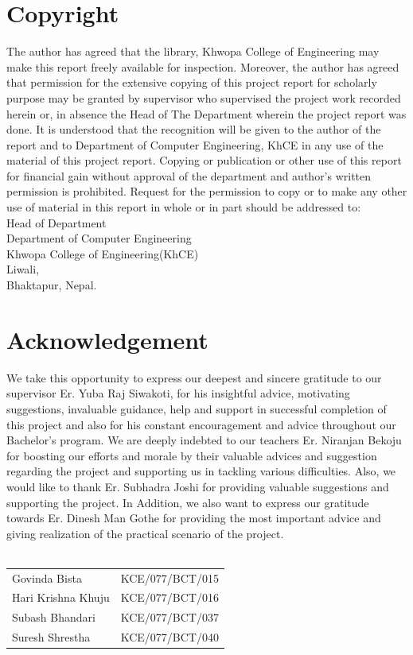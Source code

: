 			\chapter*{Copyright}
		\normalsize
		\justify
		The author has agreed that the library, Khwopa College of Engineering may make this report freely available for inspection. Moreover, the author
has agreed that permission for the extensive copying of this project report for scholarly
purpose may be granted by supervisor who supervised the project work recorded herein
or, in absence the Head of The Department wherein the project report was done. It is
understood that the recognition will be given to the author of the report and to
Department of Computer Engineering, KhCE in
any use of the material of this project report. Copying or publication or other use of this
report for financial gain without approval of the department and author’s written
permission is prohibited. Request for the permission to copy or to make any other use
of material in this report in whole or in part should be addressed to:
\vspace{1.5cm}\\
Head of Department\\
Department of Computer Engineering\\
Khwopa College of Engineering(KhCE)\\
Liwali,\\
Bhaktapur, Nepal.\\
		\break

	
		\large
			\chapter*{Acknowledgement}
		\normalsize
		\justify
			We take this opportunity to express our deepest and sincere gratitude to our supervisor
Er. Yuba Raj Siwakoti, for his insightful advice, motivating suggestions, invaluable
guidance, help and support in successful completion of this project and also for his
constant encouragement and advice throughout our Bachelor’s program.
We are deeply indebted to our teachers Er. Niranjan Bekoju for
boosting our efforts and morale by their valuable advices and suggestion regarding the
project and supporting us in tackling various difficulties.
Also, we would like to thank Er. Subhadra Joshi for providing valuable suggestions and
supporting the project.
In Addition, we also want to express our gratitude towards Er. Dinesh Man Gothe for
providing the most important advice and giving realization of the practical scenario of
the project.\\
\\ 
        \begin{table}[hbt!]
            \begin{tabular}{l l}
				Govinda Bista & KCE/077/BCT/015\\
				Hari Krishna Khuju & KCE/077/BCT/016\\
				Subash Bhandari & KCE/077/BCT/037\\
				Suresh Shrestha & KCE/077/BCT/040\\
		    \end{tabular}
        \end{table}
		\break
		

